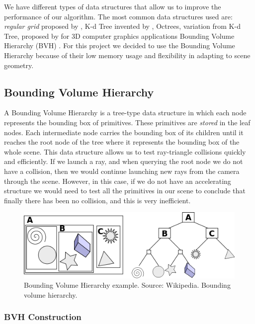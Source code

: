 \documentclass[titlepage,12pt]{report}
\begin{document}
We have different types of data structures that allow us to improve the performance of our algorithm. The most common data structures used are: \textit{regular grid} proposed by \citep[pp.~12--26]{Fujimoto1986}, K-d Tree invented by \citep[p.~509--517]{Bentley1975}, Octrees, variation from K-d Tree, proposed by \citep{DonaldMeagher1982} for 3D computer graphics applications Bounding Volume Hierarchy (BVH) \citep{Gunther2007}. For this project we decided to use the Bounding Volume Hierarchy because of their low memory usage and flexibility in adapting to scene geometry.

\subsection{Bounding Volume Hierarchy}

A Bounding Volume Hierarchy is a tree-type data structure in which each node represents the bounding box of primitives. These primitives are \textit{stored} in the leaf nodes. Each intermediate node carries the bounding box of its children until it reaches the root node of the tree where it represents the bounding box of the whole scene. This data structure allows us to test ray-triangle collisions quickly and efficiently. If we launch a ray, and when querying the root node we do not have a collision, then we would continue launching new rays from the camera through the scene. However, in this case, if we do not have an accelerating structure we would need to test all the primitives in our scene to conclude that finally there has been no collision, and this is very inefficient.

\begin{figure}[H]
	\centering
	\includegraphics[scale=0.65]{media/BVH_example.png}
	\caption{Bounding Volume Hierarchy example. Source: Wikipedia. Bounding volume hierarchy.}
	\label{bvh1}
\end{figure}

\subsubsection{BVH Construction}
\end{document}
